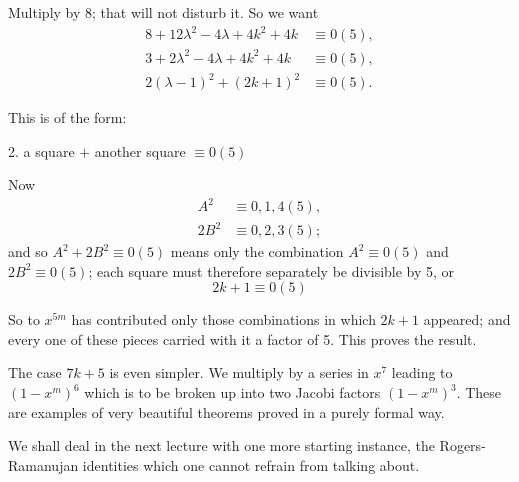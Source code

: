 Multiply by 8; that will not disturb it. So we want
\begin{align*}
  8 + 12 \lambda^2 - 4 \lambda + 4k^2 + 4k & \equiv 0(5),\\
  3+ 2 \lambda^2 - 4 \lambda + 4 k^2 + 4k & \equiv 0 (5),\\
  2 (\lambda-1)^2+ (2k+1)^2 & \equiv 0 (5).
\end{align*}

This is of the form:
\begin{center}
  2. a square $+$ another square $\equiv 0 (5)$
\end{center}

Now
\begin{align*}
  A^2 & \equiv 0, 1, 4(5),\\
  2B^2 & \equiv 0, 2, 3 (5);
\end{align*}
and so $A^2+ 2B^2\equiv 0(5)$ means only the combination $A^2 \equiv
0(5)$ and $2B^2\equiv 0 (5)$; each square must therefore separately be
divisible by 5, or
$$
2k+1 \equiv 0 (5)
$$

So to $x^{5m}$ has contributed only those combinations in which $2k+1$
appeared; and every one of these pieces carried with it a factor of
5. This proves the result.

The case $7k+5$ is even simpler. We multiply by a series in $x^7$
leading to $(1-x^m)^6$ which is to be broken up into two Jacobi
factors $(1-x^m)^3$. These are examples of very beautiful theorems
proved in a purely formal way.

We shall deal in the next lecture with one more starting instance, the\break
Rogers-Ramanujan identities which one cannot refrain from talking
about.



